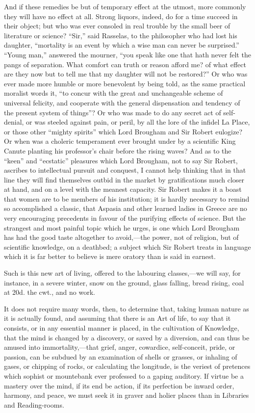 And if these remedies be but of temporary effect at the utmost,
more commonly they will have no effect at all. Strong liquors, indeed,
do for a time succeed in their object; but who was ever consoled in
real trouble by the small beer of literature or science?
``Sir,'' said Rasselas, to the philosopher who had lost his
daughter, ``mortality is an event by which a wise man can
never be surprised.'' ``Young man,'' answered the mourner,
``you speak like one that hath never felt the pangs of separation.
What comfort can truth or reason afford me? of what effect are they
now but to tell me that my daughter will not be restored?'' Or who
was ever made more humble or more benevolent by being told, as the
same practical moralist words it, ``to concur with the great and
unchangeable scheme of universal felicity, and cooperate with the
general dispensation and tendency of the present system of
things''? Or who was made to do any secret act of self-denial, or
was steeled against pain, or peril, by all the lore of the infidel La
Place, or those other ``mighty spirits'' which Lord Brougham
and Sir Robert eulogize? Or when was a choleric temperament ever
brought under by a scientific King Canute planting his professor's
chair before the rising waves? And as to the ``keen'' and
``ecstatic'' pleasures which Lord Brougham, not to say Sir
Robert, ascribes to intellectual pursuit and conquest, I cannot help
thinking that in that line they will find themselves outbid in the
market by gratifications much closer at hand, and on a level with the
meanest capacity. Sir Robert makes it a boast that women are to be
members of his institution; it is hardly necessary to remind so
accomplished a classic, that Aspasia and other learned ladies in
Greece are no very encouraging precedents in favour of the purifying
effects of science. But the strangest and most painful topic which he
urges, is one which Lord Brougham has had the good taste altogether to
avoid,—the power, not of religion, but of scientific knowledge, on a
deathbed; a subject which Sir Robert treats in language which it is
far better to believe is mere oratory than is said in earnest.

Such is this new art of living, offered to the labouring classes,—we
will say, for instance, in a severe winter, snow on the ground, glass
falling, bread rising, coal at 20d. the cwt., and no work.

It does not require many words, then, to determine that, taking
human nature as it is actually found, and assuming that there is an
Art of life, to say that it consists, or in any essential manner is
placed, in the cultivation of Knowledge, that the mind is changed by a
discovery, or saved by a diversion, and can thus be amused into
immortality,—that grief, anger, cowardice, self-conceit, pride, or
passion, can be subdued by an examination of shells or grasses, or
inhaling of gases, or chipping of rocks, or calculating the longitude,
is the veriest of pretences which sophist or mountebank ever professed
to a gaping auditory. If virtue be a mastery over the mind, if its end
be action, if its perfection be inward order, harmony, and peace, we
must seek it in graver and holier places than in Libraries and
Reading-rooms.


